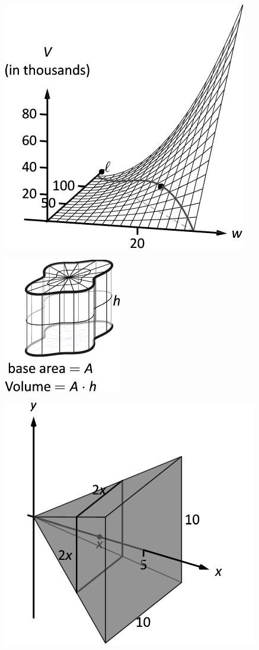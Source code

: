 \documentclass[10pt]{article}
\begin{document}
\includegraphics{figconopt2_3DBW.pdf}
\texttt{}

\includegraphics{figcross1_3DBW.pdf}
\texttt{}

\includegraphics{figcross_area1_3DBW.pdf}
\texttt{}
\end{document}
